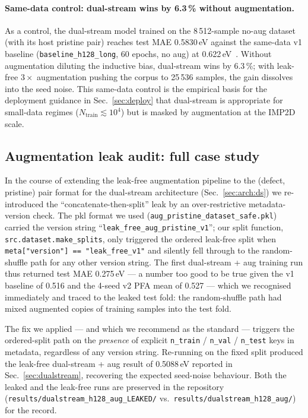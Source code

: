 \documentclass[11pt,a4paper]{article}
\begin{document}
\paragraph{Same-data control: dual-stream wins by 6.3\,\% without
augmentation.} As a control, the dual-stream model trained on the
8\,512-sample no-aug dataset (with its host pristine pair) reaches
test MAE 0.5830\,eV against the same-data v1 baseline
(\texttt{baseline\_h128\_long}, 60 epochs, no aug) at
0.622\,eV~\cite{ourPaperV12}. Without augmentation diluting the
inductive bias, dual-stream wins by 6.3\,\%; with leak-free
$3\times$ augmentation pushing the corpus to 25\,536 samples, the
gain dissolves into the seed noise. This same-data control is
the empirical basis for the deployment guidance in
Sec.~\ref{sec:deploy} that dual-stream is appropriate for small-data
regimes ($N_{\mathrm{train}} \lesssim 10^4$) but is masked by
augmentation at the IMP2D scale.

\subsection{Augmentation leak audit: full case study}\label{app:leak}

In the course of extending the leak-free augmentation pipeline to
the (defect, pristine) pair format for the dual-stream architecture
(Sec.~\ref{sec:arch:ds}) we re-introduced the
``concatenate-then-split'' leak by an over-restrictive
metadata-version check. The pkl format we used
(\texttt{aug\_pristine\_dataset\_safe.pkl}) carried the version
string ``\texttt{leak\_free\_aug\_pristine\_v1}''; our split function,
\texttt{src.dataset.make\_splits}, only triggered the ordered
leak-free split when \texttt{meta["version"] == "leak\_free\_v1"} and
silently fell through to the random-shuffle path for any other
version string. The first dual-stream + aug training run thus
returned test MAE 0.275\,eV --- a number too good to be true given
the v1 baseline of 0.516 and the 4-seed v2 PFA mean of 0.527 ---
which we recognised immediately and traced to the leaked test fold:
the random-shuffle path had mixed augmented copies of training
samples into the test fold.

The fix we applied --- and which we recommend as the standard ---
triggers the ordered-split path on the \emph{presence} of explicit
\texttt{n\_train} / \texttt{n\_val} / \texttt{n\_test} keys in
metadata, regardless of any version string. Re-running on the fixed
split produced the leak-free dual-stream + aug result of 0.5088\,eV
reported in Sec.~\ref{sec:dualstream}, recovering the expected
seed-noise behaviour. Both the leaked and the leak-free runs are
preserved in the repository (\texttt{results/dualstream\_h128\_aug\_LEAKED/}
vs.\ \texttt{results/dualstream\_h128\_aug/}) for the record.
\end{document}
